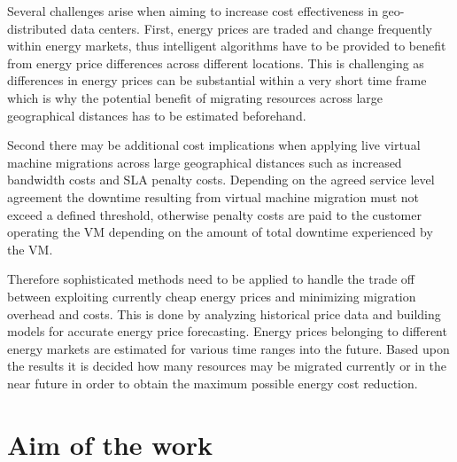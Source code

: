 Several challenges arise when aiming to increase cost effectiveness in geo-distributed data centers. First, energy prices are traded and change frequently within energy markets, thus intelligent algorithms have to be provided to benefit from energy price differences across different locations. This is challenging as differences in energy prices can be substantial within a very short time frame which is why the potential benefit of migrating resources across large geographical distances has to be estimated beforehand. 

Second there may be additional cost implications when applying live virtual machine migrations across large geographical distances such as increased bandwidth costs and SLA penalty costs. Depending on the agreed service level agreement the downtime resulting from virtual machine migration must not exceed a defined threshold, otherwise penalty costs are paid to the customer operating the VM depending on the amount of total downtime experienced by the VM. 

Therefore sophisticated methods need to be applied to handle the trade off between exploiting currently cheap energy prices and minimizing migration overhead and costs. This is done by analyzing historical price data and building models for accurate energy price forecasting. Energy prices belonging to different energy markets are estimated for various time ranges into the future. Based upon the results it is decided how many resources may be migrated currently or in the near future in order to obtain the maximum possible energy cost reduction. 




\section{Aim of the work}

